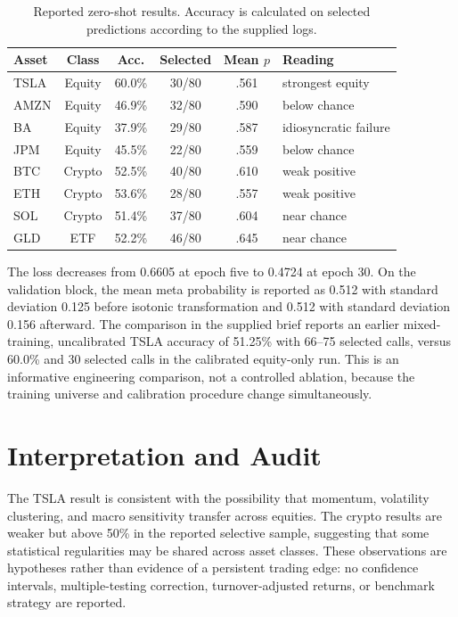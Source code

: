 \documentclass[11pt]{article}
\begin{document}
\begin{table}[t]
\centering\scriptsize
\caption{Reported zero-shot results. Accuracy is calculated on selected predictions according to the supplied logs.}
\label{tab:results}
\begin{tabular}{lccccl}
\toprule
Asset & Class & Acc. & Selected & Mean $p$ & Reading \\
\midrule
TSLA & Equity & 60.0\% & 30/80 & .561 & strongest equity \\
AMZN & Equity & 46.9\% & 32/80 & .590 & below chance \\
BA & Equity & 37.9\% & 29/80 & .587 & idiosyncratic failure \\
JPM & Equity & 45.5\% & 22/80 & .559 & below chance \\
BTC & Crypto & 52.5\% & 40/80 & .610 & weak positive \\
ETH & Crypto & 53.6\% & 28/80 & .557 & weak positive \\
SOL & Crypto & 51.4\% & 37/80 & .604 & near chance \\
GLD & ETF & 52.2\% & 46/80 & .645 & near chance \\
\bottomrule
\end{tabular}
\end{table}

The loss decreases from 0.6605 at epoch five to 0.4724 at epoch 30. On the validation block, the mean meta probability is reported as 0.512 with standard deviation 0.125 before isotonic transformation and 0.512 with standard deviation 0.156 afterward. The comparison in the supplied brief reports an earlier mixed-training, uncalibrated TSLA accuracy of 51.25\% with 66--75 selected calls, versus 60.0\% and 30 selected calls in the calibrated equity-only run. This is an informative engineering comparison, not a controlled ablation, because the training universe and calibration procedure change simultaneously.

\section{Interpretation and Audit}
The TSLA result is consistent with the possibility that momentum, volatility clustering, and macro sensitivity transfer across equities. The crypto results are weaker but above 50\% in the reported selective sample, suggesting that some statistical regularities may be shared across asset classes. These observations are hypotheses rather than evidence of a persistent trading edge: no confidence intervals, multiple-testing correction, turnover-adjusted returns, or benchmark strategy are reported.
\end{document}

